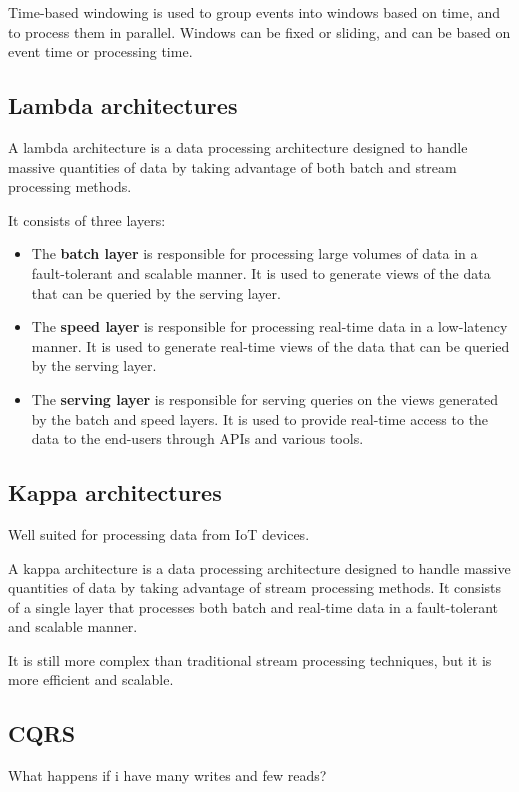 
Time-based windowing is used to group events into windows based on time, and to process them in parallel. Windows can be fixed or sliding, and can be based on event time or processing time.

\subsection{Lambda architectures}

A lambda architecture is a data processing architecture designed to handle massive quantities of data by taking advantage of both batch and stream processing methods. 
{It consists of three layers:\ns
\begin{itemize}
   \item The \textbf{batch layer} is responsible for processing large volumes of data in a fault-tolerant and scalable manner. It is used to generate views of the data that can be queried by the serving layer.
   \item The \textbf{speed layer} is responsible for processing real-time data in a low-latency manner. It is used to generate real-time views of the data that can be queried by the serving layer.
   \item The \textbf{serving layer} is responsible for serving queries on the views generated by the batch and speed layers. It is used to provide real-time access to the data to the end-users through APIs and various tools.
\end{itemize}
}


\subsection{Kappa architectures}
Well suited for processing data from IoT devices.

A kappa architecture is a data processing architecture designed to handle massive quantities of data by taking advantage of stream processing methods. It consists of a single layer that processes both batch and real-time data in a fault-tolerant and scalable manner.

It is still more complex than traditional stream processing techniques, but it is more efficient and scalable.


\subsection{CQRS}
What happens if i have many writes and few reads?

